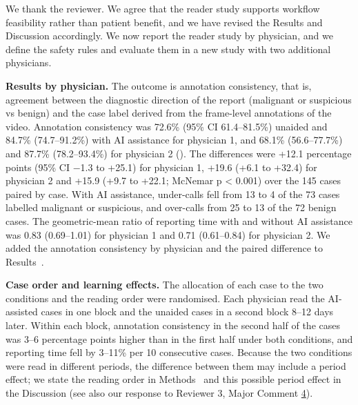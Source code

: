 We thank the reviewer. We agree that the reader study supports workflow feasibility rather than patient benefit, and we have revised the Results and Discussion accordingly. We now report the reader study by physician, and we define the safety rules and evaluate them in a new study with two additional physicians.\par

\textbf{Results by physician.} The outcome is annotation consistency, that is, agreement between the diagnostic direction of the report (malignant or suspicious vs benign) and the case label derived from the frame-level annotations of the video. Annotation consistency was 72.6\% (95\% CI 61.4--81.5\%) unaided and 84.7\% (74.7--91.2\%) with AI assistance for physician 1, and 68.1\% (56.6--77.7\%) and 87.7\% (78.2--93.4\%) for physician 2 (). The differences were +12.1 percentage points (95\% CI $-$1.3 to +25.1) for physician 1, +19.6 (+6.1 to +32.4) for physician 2 and +15.9 (+9.7 to +22.1; McNemar p < 0.001) over the 145 cases paired by case. With AI assistance, under-calls fell from 13 to 4 of the 73 cases labelled malignant or suspicious, and over-calls from 25 to 13 of the 72 benign cases. The geometric-mean ratio of reporting time with and without AI assistance was 0.83 (0.69--1.01) for physician 1 and 0.71 (0.61--0.84) for physician 2. We added the annotation consistency by physician and the paired difference to Results~\SecResReport{}.\par

\textbf{Case order and learning effects.} The allocation of each case to the two conditions and the reading order were randomised. Each physician read the AI-assisted cases in one block and the unaided cases in a second block 8--12 days later. Within each block, annotation consistency in the second half of the cases was 3--6 percentage points higher than in the first half under both conditions, and reporting time fell by 3--11\% per 10 consecutive cases. Because the two conditions were read in different periods, the difference between them may include a period effect; we state the reading order in Methods~\SecMethReader{} and this possible period effect in the Discussion (see also our response to Reviewer 3, Major Comment \hyperref[rev:R3.4]{4}).\par

